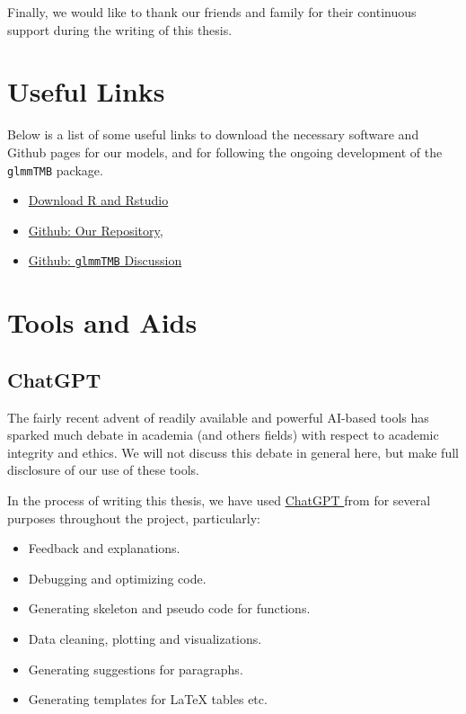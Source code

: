 \documentclass[12pt, twoside,hidelinks]{article}
\theoremstyle{definition}
\numberwithin{equation}{section}
\begin{document}
        Finally, we would like to thank our friends and family for their continuous support during the writing of this thesis.
        \newline
        
        \section*{Useful Links}

        Below is a list of some useful links to download the necessary software and Github pages for our models, and for following the ongoing development of the \texttt{glmmTMB} package.

        \begin{itemize}
            \item \href{https://posit.co/download/rstudio-desktop/}{Download R and Rstudio}
            \item \href{https://github.com/AllInCade/MasterProject}{Github: Our Repository}, \citet{masterproject}
            \item \href{https://github.com/glmmTMB/glmmTMB/issues/928}{Github: \texttt{glmmTMB} Discussion}
        \end{itemize}

        


        \newpage
        \section*{Tools and Aids}

        \subsection*{ChatGPT}

        The fairly recent advent of readily available and powerful AI-based tools has sparked much debate in academia (and others fields) with respect to academic integrity and ethics. We will not discuss this debate in general here, but make full disclosure of our use of these tools.
        \newline 
        
        In the process of writing this thesis, we have used \href{https://openai.com/chatgpt/}{ChatGPT } from \citet{OpenAI2024} for several purposes throughout the project, particularly: 

        \begin{itemize}
            \item Feedback and explanations.
            \item Debugging and optimizing code.
            \item Generating skeleton and pseudo code for functions.
            \item Data cleaning, plotting and visualizations.
            \item Generating suggestions for paragraphs.
            \item Generating templates for LaTeX tables etc.
        \end{itemize}
\end{document}
